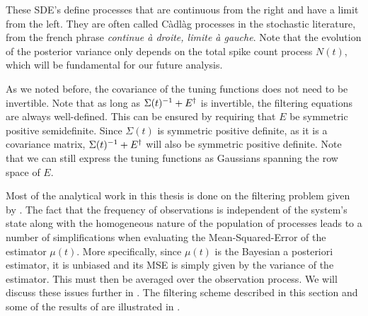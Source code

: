 These SDE's define processes that are continuous from the right and have a limit from the left. They are often called C\`adl\`ag processes in the stochastic literature, 
from the french phrase \emph{continue \`a droite, limite \`a gauche}. Note that the evolution of the posterior variance only depends on the total spike count process 
$N(t)$, which will be fundamental for our future analysis. \par
As we noted before, the covariance of the tuning functions does not need to be invertible. Note that as long as $\Sigma(t)^{-1} + E^\dagger$ is invertible, the filtering 
equations are always well-defined. This can be ensured by requiring that $E$ be symmetric positive semidefinite. Since $\Sigma(t)$ is symmetric positive definite, as it 
is a covariance matrix, $\Sigma(t)^{-1}+E^\dagger$ will also be symmetric positive definite. Note that we can still express the tuning functions as Gaussians spanning 
the row space of $E$.\par
Most of the analytical work in this thesis is done on the filtering problem given by . The fact that the frequency of observations is independent of 
the system's state along with the homogeneous nature of the population of processes leads to a number of simplifications when evaluating the Mean-Squared-Error
 of the estimator $\mu(t)$. More specifically, since $\mu(t)$ is the Bayesian a posteriori estimator, it is unbiased and 
its MSE is simply given by the variance of the estimator. This must then be averaged over the observation process. We will discuss these issues further in 
. The filtering scheme described in this section and some of the results of  are illustrated in .
